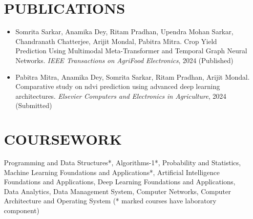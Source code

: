\documentclass[a4paper,9pt]{extarticle}
\begin{document}

\vspace{-0.4cm}
\section*{PUBLICATIONS}
\vspace{-0.3cm}
\noindent
\begin{itemize}
  \item Somrita Sarkar, Anamika Dey, Ritam Pradhan, Upendra Mohan Sarkar, Chandranath Chatterjee, Arijit Mondal, Pabitra Mitra. Crop Yield Prediction Using Multimodal Meta-Transformer and Temporal Graph Neural Networks. 
  \emph{IEEE Transactions on AgriFood Electronics}, 2024 (Published)
  \item Pabitra Mitra, Anamika Dey, Somrita Sarkar, Ritam Pradhan, Arijit Mondal. Comparative study on ndvi prediction using advanced deep learning architectures.  
  \emph{Elsevier Computers and Electronics in Agriculture}, 2024 (Submitted)
\end{itemize}

\vspace{-0.4cm}
\section*{COURSEWORK}
    \vspace{-0.2cm}
    Programming and Data Structures*, Algorithms-1*, Probability and Statistics, Machine Learning Foundations and Applications*, Artificial Intelligence Foundations and Applications, Deep Learning Foundations and Applications, Data Analytics, Data Management System, Computer Networks, Computer Architecture and Operating System (* marked courses have laboratory component)
\end{document}
